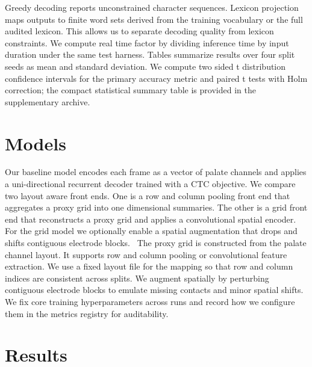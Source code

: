 \documentclass{Interspeech}
\begin{document}
Greedy decoding reports unconstrained character sequences. Lexicon projection maps outputs to finite word sets derived from the training vocabulary or the full audited lexicon. This allows us to separate decoding quality from lexicon constraints. We compute real time factor by dividing inference time by input duration under the same test harness. Tables summarize results over four split seeds as mean and standard deviation. We compute two sided t distribution confidence intervals for the primary accuracy metric and paired t tests with Holm correction; the compact statistical summary table is provided in the supplementary archive.

\section{Models}

Our baseline model encodes each frame as a vector of palate channels and applies a uni-directional recurrent decoder trained with a CTC objective. We compare two layout aware front ends. One is a row and column pooling front end that aggregates a proxy grid into one dimensional summaries. The other is a grid front end that reconstructs a proxy grid and applies a convolutional spatial encoder. For the grid model we optionally enable a spatial augmentation that drops and shifts contiguous electrode blocks.~\cite{graves2006connectionist,park2019specaugment}
The proxy grid is constructed from the palate channel layout. It supports row and column pooling or convolutional feature extraction. We use a fixed layout file for the mapping so that row and column indices are consistent across splits. We augment spatially by perturbing contiguous electrode blocks to emulate missing contacts and minor spatial shifts.
We fix core training hyperparameters across runs and record how we configure them in the metrics registry for auditability.

\section{Results}
\end{document}
